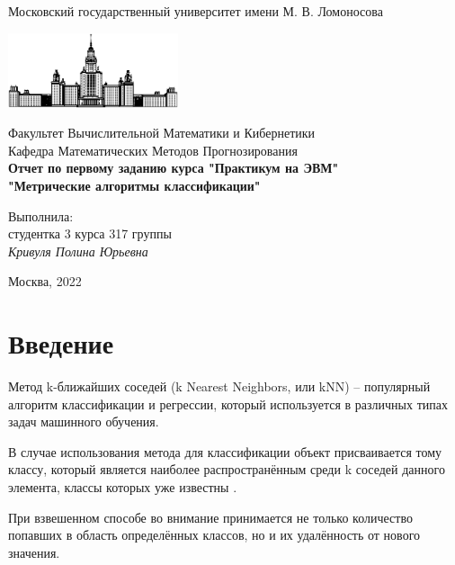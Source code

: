 \documentclass{article}
\begin{document}
\begin{titlepage}
\begin{center}
    Московский государственный университет имени М. В. Ломоносова

    \bigskip
    \includegraphics[width=50mm]{msu.eps}

    \bigskip
    Факультет Вычислительной Математики и Кибернетики\\
    Кафедра Математических Методов Прогнозирования\\[10mm]
    
    \textsf{\large\bfseries
        Отчет по первому заданию курса "Практикум на ЭВМ"\\[10mm]
        "Метрические алгоритмы классификации"
    }\\[10mm]
    \begin{flushright}
        \parbox{0.5\textwidth}{
        	Выполнила:\\
        	студентка 3 курса 317 группы \\
        	\emph{Кривуля Полина Юрьевна}\\[5mm]
        }
    \end{flushright}
    \vspace{\fill}
    Москва, 2022
\end{center}
\end{titlepage}

\newpage
\tableofcontents
\newpage

\section{Введение}

Метод k-ближайших соседей (k Nearest Neighbors, или kNN) – популярный алгоритм классификации и регрессии, который используется в различных типах задач машинного обучения. 

В случае использования метода для классификации объект присваивается тому классу, который является наиболее распространённым среди k соседей данного элемента, классы которых уже известны \cite{ss0}.

При взвешенном способе во внимание принимается не только количество попавших в область определённых классов, но и их удалённость от нового значения.
\end{document}
